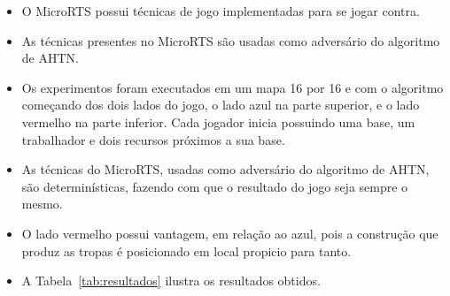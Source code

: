 \documentclass[a0,portrait]{a0poster}
\newcommand\itemadjust{\itemsep.5em \parskip0pt \parsep0pt}
\begin{document}
\begin{multicols}{2}
	\begin{itemize}
		\item O MicroRTS possui técnicas de jogo implementadas para se jogar contra.
		\item As técnicas presentes no MicroRTS são usadas como adversário do algoritmo de AHTN. 
		\item Os experimentos foram executados em um mapa 16 por 16 e com o algoritmo começando dos dois lados do jogo, o lado azul na parte superior, e o lado vermelho na parte inferior. Cada jogador inicia possuindo uma base, um trabalhador e dois recursos próximos a sua base.
		\item As técnicas do MicroRTS, usadas como adversário do algoritmo de AHTN, são determinísticas, fazendo com que o resultado do jogo seja sempre o mesmo. 
		\item O lado vermelho possui vantagem, em relação ao azul, pois a construção que produz as tropas é posicionado em local propicio para tanto. 
		\item A Tabela~\ref{tab:resultados} ilustra os resultados obtidos.
	\end{itemize}
	
	\vspace{8mm}


\end{multicols}
\end{document}
